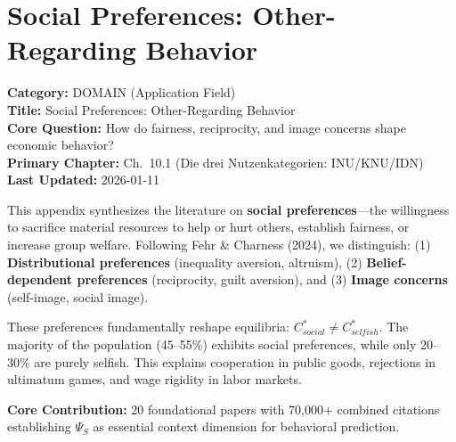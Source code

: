 \section{Social Preferences: Other-Regarding Behavior}
\label{app:social-preferences}


\begin{tcolorbox}[colback=gray!5!white, colframe=gray!75!black,
    title=\textbf{Appendix: AJ DOMAIN-SOCPREF}]
\textbf{Category:} DOMAIN (Application Field) \\
\textbf{Title:} Social Preferences: Other-Regarding Behavior \\
\textbf{Core Question:} How do fairness, reciprocity, and image concerns shape economic behavior? \\
\textbf{Primary Chapter:} Ch.\ 10.1 (Die drei Nutzenkategorien: INU/KNU/IDN) \\
\textbf{Last Updated:} 2026-01-11
\end{tcolorbox}

\begin{tcolorbox}[colback=blue!5!white, colframe=blue!75!black,
    title=\textbf{Abstract}]

This appendix synthesizes the literature on \textbf{social preferences}---the
willingness to sacrifice material resources to help or hurt others, establish
fairness, or increase group welfare. Following Fehr \& Charness (2024), we distinguish:
(1) \textbf{Distributional preferences} (inequality aversion, altruism),
(2) \textbf{Belief-dependent preferences} (reciprocity, guilt aversion), and
(3) \textbf{Image concerns} (self-image, social image).

These preferences fundamentally reshape equilibria: $C^*_{social} \neq C^*_{selfish}$.
The majority of the population (45--55\%) exhibits social preferences, while
only 20--30\% are purely selfish. This explains cooperation in public goods,
rejections in ultimatum games, and wage rigidity in labor markets.

\textbf{Core Contribution:} 20 foundational papers with 70,000+ combined citations
establishing $\Psi_S$ as essential context dimension for behavioral prediction.

\end{tcolorbox}

